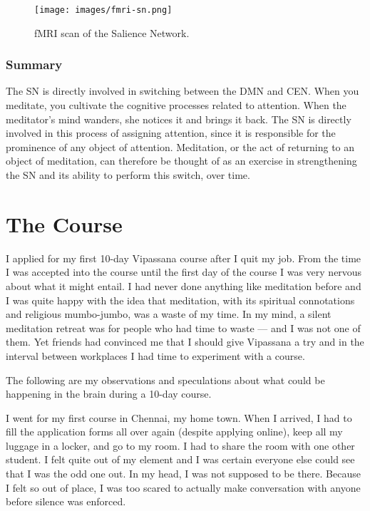 \documentclass[a4paper, amsfonts, amssymb, amsmath, reprint, showkeys, nofootinbib, twoside]{revtex4-1}
\begin{document}
\begin{figure}[H]
  \centering
  \texttt{[image: images/fmri-sn.png]}
  \caption{fMRI scan of the Salience Network.}
  \label{fig:fmri-sn}
\end{figure}

\subsubsection{Summary}

The SN is directly involved in switching between the DMN and CEN. When you meditate,
you cultivate the cognitive processes related to attention.
When the meditator's mind wanders, she notices it and brings it back.
The SN is directly involved in this process of assigning attention, since it is
responsible for the prominence of any object of attention.
Meditation, or the act of returning to an object of meditation, can therefore be
thought of as an exercise in strengthening the SN and its ability to perform this switch, over time.


\section{The Course}

I applied for my first 10-day Vipassana course after I quit my job. From the time I
was accepted into the course until the first day of the course I was very nervous
about what it might entail. I had never done anything like meditation before
and I was quite happy with the idea that meditation, with its spiritual connotations
and religious mumbo-jumbo, was a waste of my time. In my mind, a silent meditation retreat was
for people who had time to waste --- and I was not one of them. Yet friends had convinced me that I
should give Vipassana a try and in the interval between workplaces I had
time to experiment with a course.

The following are my observations and speculations about what could be happening
in the brain during a 10-day course.

I went for my first course in Chennai, my home town. When I arrived, I had to fill
the application forms all over again (despite applying online), keep all my
luggage in a locker, and go to my room. I had to share the room with one other
student. I felt quite out of my element and I was certain everyone else could see
that I was the odd one out. In my head, I was not supposed to be there. Because I felt
so out of place, I was too scared to actually make conversation with anyone before
silence was enforced.
\end{document}
